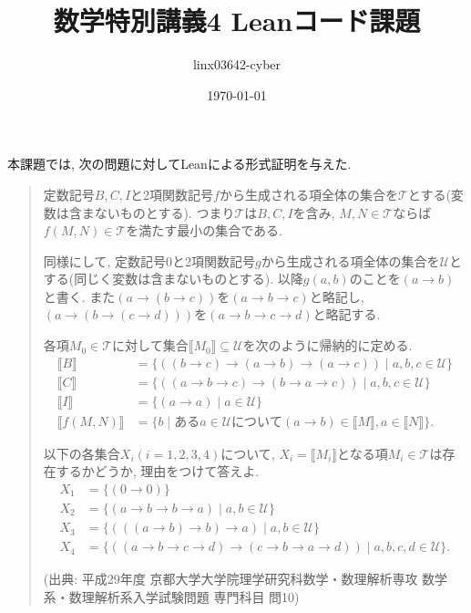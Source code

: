 \documentclass{jsarticle}
\begin{document}
\title{数学特別講義4 Leanコード課題}
\author{linx03642-cyber}
\date{\today}
\maketitle

本課題では, 次の問題に対してLeanによる形式証明を与えた.

\begin{quote}
定数記号$B, C, I$と2項関数記号$f$から生成される項全体の集合を$\mathcal{T}$とする(変数は含まないものとする).
つまり$\mathcal{T}$は$B, C, I$を含み, $M, N \in \mathcal{T}$ならば$f(M, N) \in \mathcal{T}$を満たす最小の集合である.

同様にして, 定数記号0と2項関数記号$g$から生成される項全体の集合を$\mathcal{U}$とする(同じく変数は含まないものとする).
以降$g(a, b)$のことを$(a \to b)$と書く.
また$(a \to (b \to c))$を$(a \to b \to c)$と略記し, $(a \to (b \to (c \to d)))$を$(a \to b \to c \to d)$と略記する.

各項$M_{0} \in \mathcal{T}$に対して集合$\llbracket M_{0} \rrbracket \subseteq \mathcal{U}$を次のように帰納的に定める.
\begin{align*}
    \llbracket B \rrbracket &= \{((b \to c) \to (a \to b) \to (a \to c)) \mid a, b, c \in \mathcal{U}\} \\
    \llbracket C \rrbracket &= \{((a \to b \to c) \to (b \to a \to c)) \mid a, b, c \in \mathcal{U}\} \\
    \llbracket I \rrbracket &= \{(a \to a) \mid a \in \mathcal{U}\} \\
    \llbracket f(M, N) \rrbracket &= \{b \mid あるa \in \mathcal{U} について(a \to b) \in \llbracket M \rrbracket, a \in \llbracket N \rrbracket\}.
\end{align*}

以下の各集合$X_{i} (i = 1, 2, 3, 4)$について, $X_{i} = \llbracket M_{i} \rrbracket$となる項$M_{i} \in \mathcal{T}$は存在するかどうか, 理由をつけて答えよ.
\begin{align*}
    X_{1} &= \{(0 \to 0)\} \\
    X_{2} &= \{(a \to b \to b \to a) \mid a, b \in \mathcal{U}\} \\
    X_{3} &= \{(((a \to b) \to b) \to a) \mid a, b \in \mathcal{U}\} \\
    X_{4} &= \{((a \to b \to c \to d) \to (c \to b \to a \to d)) \mid a, b, c, d \in \mathcal{U}\}.
\end{align*}

(出典: 平成29年度 京都大学大学院理学研究科数学・数理解析専攻 数学系・数理解析系入学試験問題 専門科目 問10)
\end{quote}
\end{document}
